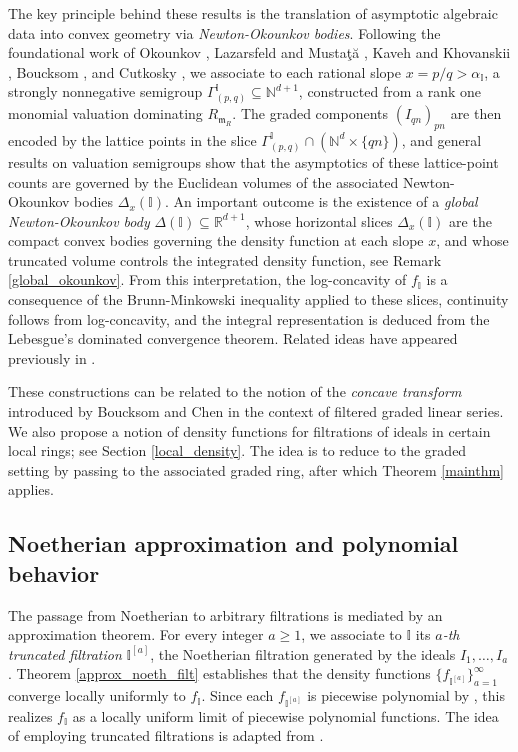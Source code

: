\documentclass[12pt,a4paper]{amsart}
\theoremstyle{plain}
\theoremstyle{definition}
\numberwithin{equation}{theorem}
\begin{document}
The key principle behind these results is the translation of asymptotic algebraic data into convex geometry via \emph{Newton-Okounkov bodies}. Following the foundational work of Okounkov \cite{Oko96}, Lazarsfeld and Musta\c{t}\u{a} \cite{LM09}, Kaveh and Khovanskii \cite{KK12}, Boucksom \cite{Bou14}, and Cutkosky \cite{Cut14}, we associate to each rational slope $x=p/q>\alpha_{\mathbb{I}}$, a strongly nonnegative semigroup $\Gamma^{\mathbb{I}}_{(p,q)} \subseteq \mathbb{N}^{d+1}$, constructed from a rank one monomial valuation dominating $R_{\mathfrak{m}_R}$. The graded components ${(I_{qn})}_{pn}$ are then encoded by the lattice points in the slice $\Gamma^{\mathbb{I}}_{(p,q)} \cap \left(\mathbb{N}^d \times \{qn\}\right)$, and general results on valuation semigroups show that the asymptotics of these lattice-point counts are governed by the Euclidean volumes of the associated Newton-Okounkov bodies $\Delta_x(\mathbb{I})$. An important outcome is the existence of a \emph{global Newton-Okounkov body} $\Delta(\mathbb{I}) \subseteq \mathbb{R}^{d+1}$, whose horizontal slices $\Delta_x(\mathbb{I})$ are the compact convex bodies governing the density function at each slope $x$, and whose truncated volume controls the integrated density function, see Remark \ref{global_okounkov}. From this interpretation, the log-concavity of $f_{\mathbb{I}}$ is a consequence of the Brunn-Minkowski inequality applied to these slices, continuity follows from log-concavity, and the integral representation is deduced from the Lebesgue's dominated convergence theorem. Related ideas have appeared previously in \cite{CMM24}.

These constructions can be related to the notion of the \emph{concave transform} introduced by Boucksom and Chen \cite{BC11} in the context of filtered graded linear series. We also propose a notion of density functions for filtrations of ideals in certain local rings; see Section \ref{local_density}. The idea is to reduce to the graded setting by passing to the associated graded ring, after which Theorem \ref{mainthm} applies.

\subsection*{Noetherian approximation and polynomial behavior}
The passage from Noetherian to arbitrary filtrations is mediated by an approximation theorem. For every integer $a\ge1$, we associate to $\mathbb{I}$ its \emph{$a$-th truncated filtration} $\mathbb{I}^{[a]}$, the Noetherian filtration generated by the ideals $I_1,\ldots,I_a$. Theorem \ref{approx_noeth_filt} establishes that the density functions $\{f_{\mathbb{I}^{[a]}}\}_{a=1}^{\infty}$ converge locally uniformly to $f_{\mathbb{I}}$. Since each $f_{\mathbb{I}^{[a]}}$ is piecewise polynomial by \cite{DRT25}, this realizes $f_{\mathbb{I}}$ as a locally uniform limit of piecewise polynomial functions. The idea of employing truncated filtrations is adapted from \cite{CSS19}.
\end{document}

